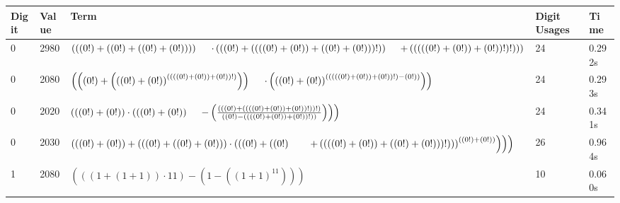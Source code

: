 \documentclass{article}
\theoremstyle{nonumberplain}
\newcommand{\nldelims}[1]{\right.#1\left.}
\newcommand{\mnl}{\nldelims{\newline}}
\begin{document}
\begin{center}
    \begin{longtable}{ | l | l | p{9.5cm} | l | l | }
    \hline \textbf{Digit} & \textbf{Value} & \textbf{Term} & \textbf{Digit Usages} & \textbf{Time} \\\hline
            0 & 2980 & \( \left(\left(\left(0!\right) + \left(\left(0!\right) + \left(\left(0!\right) + \left(0!\right)\right)\right)\right) \mnl\quad\cdot \left(\left(\left(0!\right) + \left(\left(\left(\left(0!\right) + \left(0!\right)\right) + \left(\left(0!\right) + \left(0!\right)\right)\right)!\right)\right) \nldelims{\mnl}\ \ + \left(\left(\left(\left(\left(0!\right) + \left(0!\right)\right) + \left(0!\right)\right)!\right)!\right)\right)\right) \) & 24 & 0.292s \\\hline
            0 & 2080 & \( \left(\left(\left(0!\right) + \left({\left(\left(0!\right) + \left(0!\right)\right)}^{\left(\left(\left(\left(0!\right) + \left(0!\right)\right) + \left(0!\right)\right)!\right)}\right)\right) \mnl\quad\cdot \left({\left(\left(0!\right) + \left(0!\right)\right)}^{\left(\left(\left(\left(\left(0!\right) + \left(0!\right)\right) + \left(0!\right)\right)!\right) - \left(0!\right)\right)}\right)\right) \) & 24 & 0.293s \\\hline
            0 & 2020 & \( \left(\left(\left(0!\right) + \left(0!\right)\right) \cdot \left(\left(\left(0!\right) + \left(0!\right)\right) \nldelims{\mnl}\ \ - \left(\frac{\left(\left(\left(0!\right) + \left(\left(\left(\left(0!\right) + \left(0!\right)\right) + \left(0!\right)\right)!\right)\right)!\right)}{\left(\left(0!\right) - \left(\left(\left(\left(0!\right) + \left(0!\right)\right) + \left(0!\right)\right)!\right)\right)}\right)\right)\right) \) & 24 & 0.341s \\\hline
            0 & 2030 & \( \left(\left(\left(0!\right) + \left(0!\right)\right) + \left(\left(\left(0!\right) + \left(\left(0!\right) + \left(0!\right)\right)\right) \cdot \left(\left(\left(0!\right) + \left(\left(0!\right) \nldelims{\nldelims{\nldelims{\nldelims{\mnl}}}}\ \ + \left(\left(\left(\left(0!\right) + \left(0!\right)\right) + \left(\left(0!\right) + \left(0!\right)\right)\right)!\right)\right)\right)^{\left(\left(0!\right) + \left(0!\right)\right)}\right)\right)\right) \) & 26 & 0.964s \\\hline
            1 & 2080 & \( \left(\left(\left(1 + \left(1 + 1\right)\right) \cdot 11\right) - \left(1 - \left({\left(1 + 1\right)}^{11}\right)\right)\right) \) & 10 & 0.060s \\\hline

\end{longtable}
\end{center}
\end{document}
